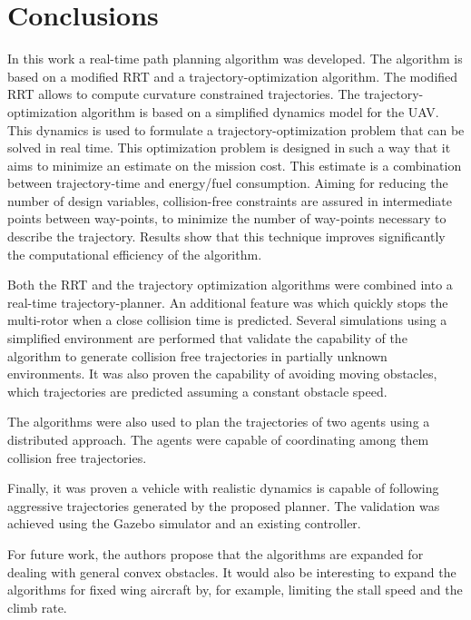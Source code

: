 \section{Conclusions}
In this work a real-time path planning algorithm was developed. The algorithm is based on a modified RRT and a trajectory-optimization algorithm. The modified RRT allows to compute curvature constrained trajectories. The trajectory-optimization algorithm is based on a simplified dynamics model for the UAV. This dynamics is used to formulate a trajectory-optimization problem that can be solved in real time. This optimization problem is designed in such a way that it aims to minimize an estimate on the mission cost. This estimate is a combination between trajectory-time and energy/fuel consumption. Aiming for reducing the number of design variables, collision-free constraints are assured in intermediate points between way-points, to minimize the number of way-points necessary to describe the trajectory. Results show that this technique improves significantly the computational efficiency of the algorithm.
\par
Both the RRT and the trajectory optimization algorithms were combined into a real-time trajectory-planner. An additional feature was which quickly stops the multi-rotor when a close collision time is predicted. Several simulations using a simplified environment are performed that validate the capability of the algorithm to generate collision free trajectories in partially unknown environments. It was also proven the capability of avoiding moving obstacles, which trajectories are predicted assuming a constant obstacle speed.
\par
The algorithms were also used to plan the trajectories of two agents using a distributed approach. The agents were capable of coordinating among them collision free trajectories.
\par
Finally, it was proven a vehicle with realistic dynamics is capable of following aggressive trajectories generated by the proposed planner. The validation was achieved using the Gazebo simulator and an existing controller.
\par
For future work, the authors propose that the algorithms are expanded for dealing with general convex obstacles. It would also be interesting to expand the algorithms for fixed wing aircraft by, for example, limiting the stall speed and the climb rate.